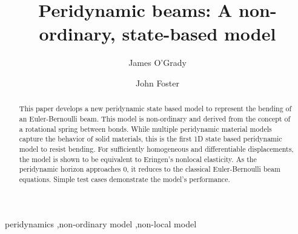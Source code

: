 \documentclass[preprint,review,12pt]{elsarticle}
\begin{document}
\begin{frontmatter}

\title{Peridynamic beams: A non-ordinary, state-based model}

\author[utsa]{James O'Grady}

\author[utsa]{John Foster}


\address[utsa]{The University of Texas at San Antonio, One UTSA Circle, San Antonio, TX 78249}

\begin{abstract}
This paper develops a new peridynamic state based model to represent the bending of an Euler-Bernoulli beam.
This model is non-ordinary and derived from the concept of a rotational spring between bonds.
While multiple peridynamic material models capture the behavior of solid materials, this is the first 1D state based peridynamic model to resist bending.
For sufficiently homogeneous and differentiable displacements, the model is shown to be equivalent to Eringen's nonlocal elasticity.
As the peridynamic horizon approaches 0, it reduces to the classical Euler-Bernoulli beam equations.
Simple test cases demonstrate the model's performance.
\end{abstract}

\begin{keyword}
peridynamics \sep non-ordinary model \sep non-local model
\end{keyword}

\end{frontmatter}
\end{document}
